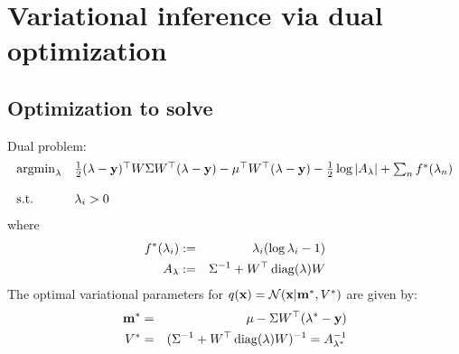 \documentclass[10pt,english]{article}
\begin{document}
\section{Variational inference via dual optimization}
\subsection{Optimization to solve}
Dual problem:
\begin{eqnarray*}
 \begin{array}{ll} 	\operatorname{argmin}_{\lambda}	&	\frac{1}{2} (\lambda-\mathbf{y})^\top W\Sigma W^\top(\lambda-\mathbf{y})-\mu^\top W^\top(\lambda-\mathbf{y})-\frac{1}{2}\log\vert A_\lambda\vert+\sum_nf^\ast(\lambda_n)\\~\\
			\mbox{s.t.}		&	\lambda_i>0
 \end{array}
\end{eqnarray*}
where 
\begin{eqnarray*}
 f^\ast(\lambda_i)	&:=&		\lambda_i(\log\lambda_i-1)\\
 A_\lambda		&:=&		\Sigma^{-1}+W^\top \operatorname{diag}(\lambda)W
\end{eqnarray*}
The optimal variational parameters for $q(\mathbf{x})=\mathcal{N}(\mathbf{x}\vert\mathbf{m}^\ast,V^\ast)$ are given by:
\begin{eqnarray*}
 \mathbf{m}^\ast		&=&		\mu-\Sigma W^\top(\lambda^\ast-\mathbf{y})\\
 V^\ast			&=&		(\Sigma^{-1}+W^\top \operatorname{diag}(\lambda)W)^{-1}=A_{\lambda^\ast}^{-1}
\end{eqnarray*}
\end{document}
